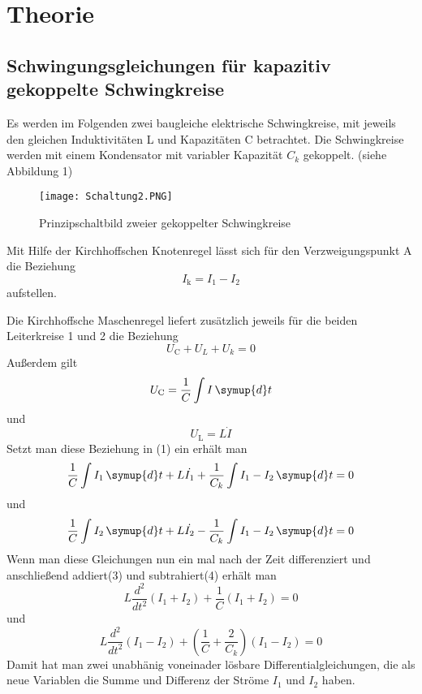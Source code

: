 \section{Theorie}
\label{sec:Theorie}

\subsection{Schwingungsgleichungen für kapazitiv gekoppelte Schwingkreise}
Es werden im Folgenden zwei baugleiche elektrische Schwingkreise, mit jeweils den gleichen Induktivitäten L und Kapazitäten C betrachtet. Die Schwingkreise werden mit 
einem Kondensator mit variabler Kapazität $ C_k $ gekoppelt. (siehe Abbildung 1)
\begin{figure}
    \centering
    \texttt{[image: Schaltung2.PNG]}
    \caption{Prinzipschaltbild zweier gekoppelter Schwingkreise}
    \label{fig:DatenLangeSpule}
  \end{figure}
Mit Hilfe der Kirchhoffschen Knotenregel lässt sich für den Verzweigungspunkt A die Beziehung
\begin{equation}
    I_\text{k} = I_1 - I_2
    \label{eqn:Knotenregel}
  \end{equation}
  aufstellen.

Die Kirchhoffsche Maschenregel liefert zusätzlich jeweils für die beiden Leiterkreise 1 und 2 die Beziehung
\begin{equation}
    U_\text{C} + U_L + U_k = 0
    \label{eqn:Maschenregel}
  \end{equation}
Außerdem gilt
\begin{equation}
    U_\text{C} = \frac{1}{C} \int I \, \symup{d}t
  \end{equation}
  und
  \begin{equation}
    U_\text{L} = L \dot{I}
  \end{equation}
Setzt man diese Beziehung in (1) ein erhält man 
\begin{equation}
    \frac{1}{C} \int I_1 \, \symup{d}t + L \dot{I_1} + \frac{1}{C_k} \int I_1 - I_2 \, \symup{d}t = 0
\end{equation}
und
\begin{equation}
    \frac{1}{C} \int I_2 \, \symup{d}t + L \dot{I_2} - \frac{1}{C_k} \int I_1 - I_2 \, \symup{d}t = 0
\end{equation}
Wenn man diese Gleichungen nun ein mal nach der Zeit differenziert und anschließend addiert(3) und subtrahiert(4) erhält man
\begin{equation}
    L \frac{d^2}{dt^2}(I_1 + I_2) + \frac{1}{C}(I_1 +I_2) = 0
    \label{eqn:Drei}
\end{equation}
und
\begin{equation}
    L \frac{d^2}{dt^2}(I_1 - I_2) + ( \frac{1}{C} + \frac{2}{C_k} ) (I_1 - I_2) = 0
    \label{eqn:Vier}
\end{equation}
Damit hat man zwei unabhänig voneinader lösbare Differentialgleichungen, die als neue Variablen die Summe und Differenz der Ströme $ I_1 $ und $ I_2 $ haben.

